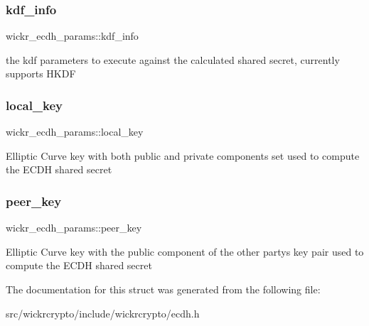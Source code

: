 \subsubsection{\texorpdfstring{kdf\+\_\+info}{kdf\_info}}
{\footnotesize\ttfamily wickr\+\_\+ecdh\+\_\+params\+::kdf\+\_\+info}

the kdf parameters to execute against the calculated shared secret, currently supports H\+K\+DF \mbox{\label{structwickr__ecdh__params_aab5a55e6a516ab8268ef6739ae1422cd}} 
\subsubsection{\texorpdfstring{local\+\_\+key}{local\_key}}
{\footnotesize\ttfamily wickr\+\_\+ecdh\+\_\+params\+::local\+\_\+key}

Elliptic Curve key with both public and private components set used to compute the E\+C\+DH shared secret \mbox{\label{structwickr__ecdh__params_ab17d6191b23fa7fd1befd03b2eee4ba9}} 
\subsubsection{\texorpdfstring{peer\+\_\+key}{peer\_key}}
{\footnotesize\ttfamily wickr\+\_\+ecdh\+\_\+params\+::peer\+\_\+key}

Elliptic Curve key with the public component of the other party\textquotesingle{}s key pair used to compute the E\+C\+DH shared secret 

The documentation for this struct was generated from the following file\+:\begin{DoxyCompactItemize}
\item 
src/wickrcrypto/include/wickrcrypto/ecdh.\+h\end{DoxyCompactItemize}
